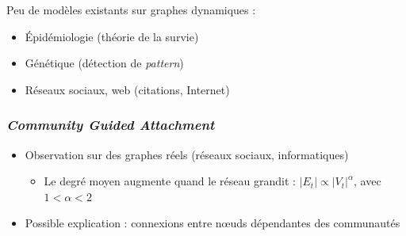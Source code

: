 \documentclass[c]{beamer}
\begin{document}
\begin{frame}
\begin{columns}
\begin{column}{.5\textwidth}
{\begin{figure}
                \end{figure}
            }
        \end{column}
    \end{columns}
\end{frame}

\begin{frame}
        Peu de modèles existants sur graphes dynamiques :
        \begin{itemize}
            \item Épidémiologie (théorie de la survie)
            \item Génétique (détection de \emph{pattern})
            \item Réseaux sociaux, web (citations, Internet)
        \end{itemize}
\end{frame}

\begin{frame}
    \frametitle{\emph{Community Guided Attachment}}

    \begin{itemize}
        \item Observation sur des graphes réels (réseaux sociaux, informatiques)
        \begin{itemize}
            \item Le degré moyen augmente quand le réseau grandit : $|E_t|
                \propto |V_t|^{\alpha}$, avec $1 < \alpha < 2$
        \end{itemize}
        \item Possible explication : connexions entre n\oe{}uds dépendantes
            des communautés
    \end{itemize}
\end{frame}
\end{document}
